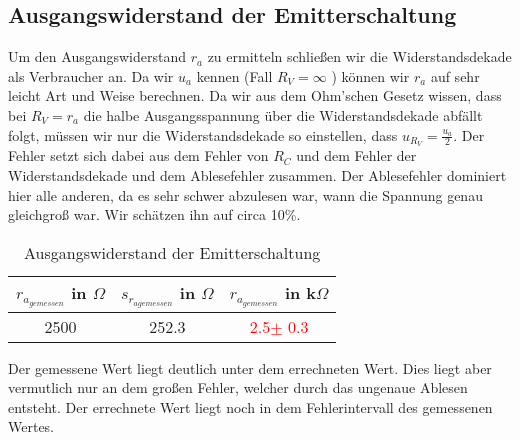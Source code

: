 \subsection{Ausgangswiderstand der Emitterschaltung}

Um den Ausgangswiderstand $r_a$ zu ermitteln schließen wir die Widerstandsdekade als Verbraucher an. Da wir $u_a$ kennen (Fall $R_V = \infty$ ) können wir 
$r_a$ auf sehr leicht Art und Weise berechnen. Da wir aus dem Ohm’schen Gesetz wissen, dass bei $R_V = r_a$ die halbe Ausgangsspannung über die Widerstandsdekade 
abfällt folgt, müssen wir nur die Widerstandsdekade so einstellen, dass $u_{R_V} = \frac{u_a}{2}$. Der Fehler setzt sich dabei aus dem Fehler von $R_C$ und dem Fehler der Widerstandsdekade
und dem Ablesefehler zusammen. Der Ablesefehler dominiert hier alle anderen, da es sehr schwer abzulesen war, wann die Spannung genau gleichgroß war. Wir schätzen ihn auf circa 10\%. 
\begin{table}[h!]
    \centering
    \begin{tabular}[h]{c|c||c}
        $r_{a_{gemessen}}$ in $\Omega $ & $s_{r_{a{gemessen}}}$ in $\Omega $ & $r_{a_{gemessen}}$ in k$\Omega$\\
       \hline
      
        2500 & 252.3 & \textcolor{red}{2.5$\pm $ 0.3}\\
    \end{tabular}
    \caption{Ausgangswiderstand der Emitterschaltung}
\end{table}
Der gemessene Wert liegt deutlich unter dem errechneten Wert. Dies liegt aber vermutlich 
nur an dem großen Fehler, welcher durch das ungenaue Ablesen entsteht. Der errechnete Wert 
liegt noch in dem Fehlerintervall des gemessenen Wertes.